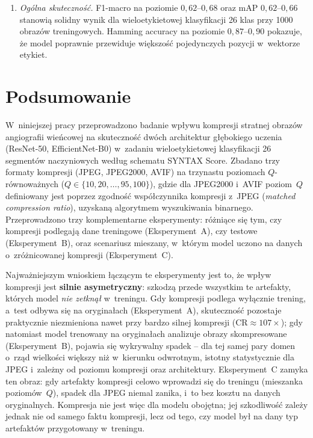 \documentclass[12pt,a4paper]{article}
\begin{document}
\begin{enumerate}
    \item \emph{Ogólna skuteczność.} F1-macro na poziomie $0{,}62$--$0{,}68$ oraz mAP $0{,}62$--$0{,}66$ stanowią solidny wynik dla wieloetykietowej klasyfikacji 26 klas przy 1000 obrazów treningowych. Hamming accuracy na poziomie $0{,}87$--$0{,}90$ pokazuje, że model poprawnie przewiduje większość pojedynczych pozycji w~wektorze etykiet.
\end{enumerate}

\clearpage
\section{Podsumowanie}
\label{sec:podsumowanie}

W~niniejszej pracy przeprowadzono badanie wpływu kompresji stratnej obrazów angiografii wieńcowej na skuteczność dwóch architektur głębokiego uczenia (ResNet-50, EfficientNet-B0) w~zadaniu wieloetykietowej klasyfikacji 26 segmentów naczyniowych według schematu SYNTAX Score. Zbadano trzy formaty kompresji (JPEG, JPEG2000, AVIF) na trzynastu poziomach $Q$-równoważnych ($Q \in \{10, 20, \dots, 95, 100\}$), gdzie dla JPEG2000 i~AVIF poziom~$Q$ definiowany jest poprzez zgodność współczynnika kompresji z~JPEG (\textit{matched compression ratio}), uzyskaną algorytmem wyszukiwania binarnego. Przeprowadzono trzy komplementarne eksperymenty: różniące się tym, czy kompresji podlegają dane treningowe (Eksperyment~A), czy testowe (Eksperyment~B), oraz scenariusz mieszany, w~którym model uczono na danych o~zróżnicowanej kompresji (Eksperyment~C).

Najważniejszym wnioskiem łączącym te eksperymenty jest to, że wpływ kompresji jest \textbf{silnie asymetryczny}: szkodzą przede wszystkim te artefakty, których model \emph{nie zetknął} w~treningu. Gdy kompresji podlega wyłącznie trening, a~test odbywa się na oryginałach (Eksperyment~A), skuteczność pozostaje praktycznie niezmieniona nawet przy bardzo silnej kompresji ($\mathrm{CR} \approx 107\times$); gdy natomiast model trenowany na oryginałach analizuje obrazy skompresowane (Eksperyment~B), pojawia się wykrywalny spadek -- dla tej samej pary domen o~rząd wielkości większy niż w~kierunku odwrotnym, istotny statystycznie dla JPEG i~zależny od poziomu kompresji oraz architektury. Eksperyment~C zamyka ten obraz: gdy artefakty kompresji celowo wprowadzi się do treningu (mieszanka poziomów~$Q$), spadek dla JPEG niemal zanika, i~to bez kosztu na danych oryginalnych. Kompresja nie jest więc dla modelu obojętna; jej szkodliwość zależy jednak nie od samego faktu kompresji, lecz od tego, czy model był na dany typ artefaktów przygotowany w~treningu.
\end{document}
